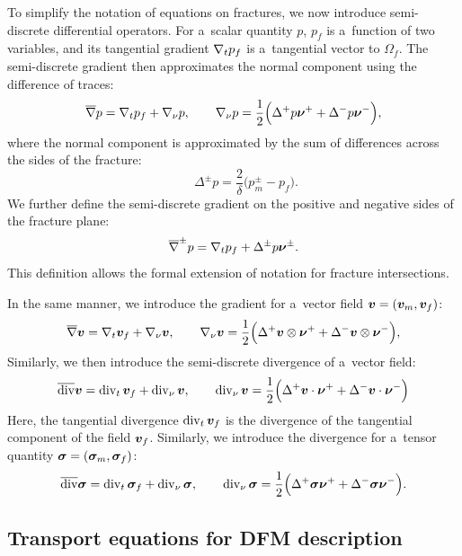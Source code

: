 To simplify the notation of equations on fractures, we now introduce
semi-discrete differential operators. For a~scalar quantity $p$, $p_f$ is
a~function of two variables, and its tangential gradient $\nabla_t p_f$ is
a~tangential vector to $\Omega_f$. The semi-discrete gradient then approximates
the normal component using the difference of traces:
$$
\overline{\nabla} p = \nabla_t p_f + \nabla_\nu p,\qquad
\nabla_\nu p = \frac{1}{2}\Big(\Delta^+ p{\bm{\nu}}^+  + \Delta^- p{\bm{\nu}}^-\Big),
$$
where the normal component is approximated by the sum of differences across the
sides of the fracture:
$$
\qquad \Delta^\pm p = \frac{2}{\delta}\Big(p_m^\pm - p_f\Big).
$$
We further define the semi-discrete gradient on the positive and negative sides
of the fracture plane:
$$ \overline{\nabla}^\pm p = \nabla_t p_f + \Delta^\pm p{\bm{\nu}}^\pm. $$
This definition allows the formal extension of notation for fracture
intersections.

In the same manner, we introduce the gradient for a~vector field
${\bm{v}}=({\bm{v}}_m, {\bm{v}}_f)$:
$$
\overline{\nabla} {\bm{v}} = \nabla_t {\bm{v}}_f + \nabla_\nu {\bm{v}},\qquad
\nabla_\nu {\bm{v}} = \frac{1}{2}\Big(\Delta^+{\bm{v}} \otimes{\bm{\nu}}^+  + \Delta^- {\bm{v}}\otimes{\bm{\nu}}^-\Big),
$$
Similarly, we then introduce the semi-discrete divergence of a~vector field:
$$
\overline{\mathop{\mathrm{div}}\nolimits} {\bm{v}} = \mathop{\mathrm{div}}\nolimits_t {\bm{v}}_f + \mathop{\mathrm{div}}\nolimits_\nu {\bm{v}},\qquad
\mathop{\mathrm{div}}\nolimits_\nu {\bm{v}} = \frac{1}{2}\Big(\Delta^+ {\bm{v}} \cdot {\bm{\nu}}^+  + \Delta^- {\bm{v}} \cdot {\bm{\nu}}^-\Big)
$$
Here, the tangential divergence $\mathop{\mathrm{div}}\nolimits_t {\bm{v}}_f$ is the divergence of the
tangential component of the field ${\bm{v}}_f$. Similarly, we introduce the
divergence for a~tensor quantity ${\bm{\sigma}} = ({\bm{\sigma}}_m, {\bm{\sigma}}_f)$:
$$
\overline{\mathop{\mathrm{div}}\nolimits} {\bm{\sigma}} = \mathop{\mathrm{div}}\nolimits_t {\bm{\sigma}}_f + \mathop{\mathrm{div}}\nolimits_\nu {\bm{\sigma}},\qquad
\mathop{\mathrm{div}}\nolimits_\nu {\bm{\sigma}} = \frac{1}{2}\Big(\Delta^+ {\bm{\sigma}} {\bm{\nu}}^+  + \Delta^- {\bm{\sigma}} {\bm{\nu}}^-\Big).
$$

\subsection{Transport equations for DFM description}
\label{sec:transport_DFN}

